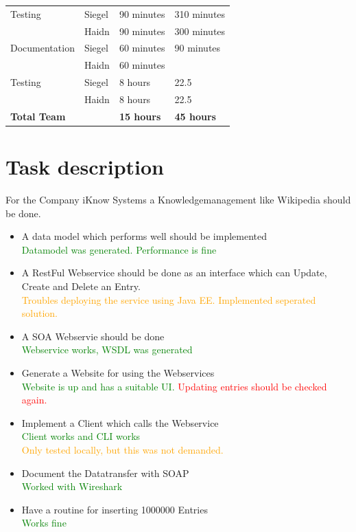 \documentclass[12pt]{article}
\begin{document}
\begin{table}[h]
\begin{tabular}{|p{}|p{}|p{}|p{}|}
Testing & Siegel &  90  minutes  &  310  minutes  \\  
  & Haidn &  90  minutes  & 300  minutes   \\ \hline 


Documentation  & Siegel &  60 minutes  &  90 minutes  \\  
  & Haidn &  60  minutes  &    \\ \hline 

\hline 

Testing & Siegel &  8 hours  & 22.5   \\  
  & Haidn &  8 hours   & 22.5   \\ \hline 


 \hline 
\textbf{Total Team} & & \textbf{15 hours} &\textbf{45 hours}  \\ \hline
\end{tabular}
\end{table}

\section{Task description}
For the Company iKnow Systems a Knowledgemanagement like Wikipedia should be done.
\begin{itemize}
\item A data model which performs well should be implemented\\
\textcolor{green}{Datamodel was generated. Performance is fine}
\item A RestFul Webservice should be done as an interface which can Update, Create and Delete an Entry.\\
\textcolor{orange}{Troubles deploying the service using Java EE. Implemented seperated solution.}
\item A SOA Webservie should be done\\
\textcolor{green}{Webservice works, WSDL was generated} \\
\item Generate a Website for using the Webservices\\
\textcolor{green}{Website is up and has a suitable UI.}
\textcolor{red}{Updating entries should be checked again.}
\item Implement a Client which calls the Webservice\\
\textcolor{green}{Client works and CLI works} \\
\textcolor{orange}{Only tested locally, but this was not demanded.}
\item Document the Datatransfer with SOAP\\
\textcolor{green}{Worked with Wireshark}
\item Have a routine for inserting 1000000 Entries \\
\textcolor{green}{Works fine} \\
\end{itemize}
\end{document}

